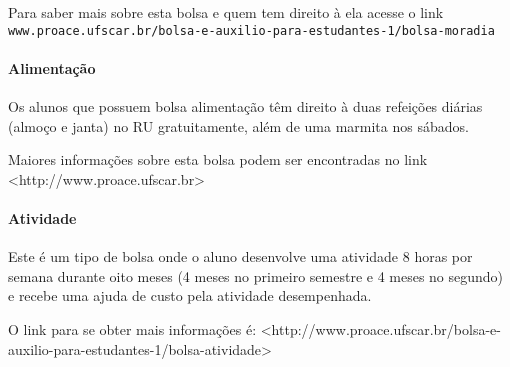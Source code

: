 Para saber mais sobre esta bolsa e quem tem direito à ela acesse o link \texttt{www.proace.ufscar.br/bolsa-e-auxilio-para-estudantes-1/bolsa-moradia}

\paragraph{Alimentação}
Os alunos que possuem bolsa alimentação têm direito à duas refeições diárias (almoço e janta) no RU gratuitamente, além de uma marmita nos sábados. 

Maiores informações sobre esta bolsa podem ser encontradas no link <http://www.proace.ufscar.br>

\paragraph{Atividade}
Este é um tipo de bolsa onde o aluno desenvolve uma atividade 8 horas por semana durante oito meses (4 meses no primeiro semestre e 4 meses no segundo) e recebe uma ajuda de custo pela atividade desempenhada.

O link para se obter mais informações é:
\newline <http://www.proace.ufscar.br/bolsa-e-auxilio-para-estudantes-1/bolsa-atividade>
